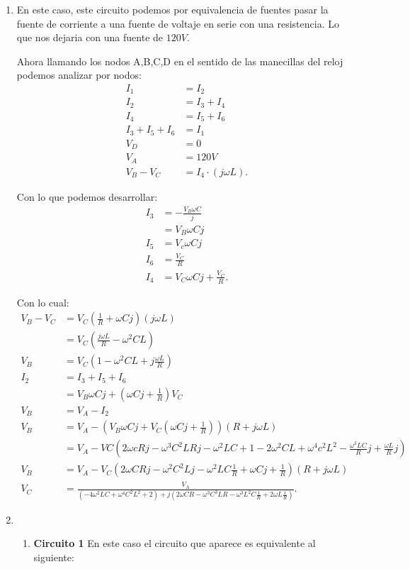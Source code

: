 \documentclass[12pt]{article}
\begin{document}
\begin{enumerate}
  \item 

    En este caso, este circuito podemos por equivalencia de fuentes pasar la fuente de corriente a una fuente de voltaje en serie con una resistencia. Lo que nos dejaria con una fuente de $120V$.

    Ahora llamando los nodos  A,B,C,D en el sentido de las manecillas del reloj podemos analizar por nodos:
     \begin{align*}
      I_1 &= I_2 \\
      I_2 &= I_3 + I_4 \\
      I_4 &= I_5 + I_6 \\
      I_3 + I_5 + I_6 &= I_1 \\
      V_D &= 0 \\
      V_{A} &= 120V \\
      V_B - V_C &= I_4\cdot (j\omega L) 
    .\end{align*}

    Con lo que podemos desarrollar:
    \begin{align*}
      I_3 &= -\frac{V_B\omega C}{j} \\
      &= V_B\omega Cj \\
      I_5 &=V_{c}\omega Cj \\
      I_6 &= \frac{V_C}{R} \\
      I_4 &= V_C\omega Cj + \frac{V_C}{R}
    .\end{align*}

    Con lo cual:
    \begin{align*}
      V_B - V_C &= V_C\left( \frac{1}{R}+\omega Cj \right) \left( j\omega L \right)\\
      &= V_C \left( \frac{j\omega L}{R} - \omega^2 CL \right)  \\
      V_B &= V_C\left( 1 - \omega^2CL + j \frac{\omega L}{R} \right)  \\
      I_2 &= I_3 + I_5 + I_6 \\
      &= V_B\omega Cj + \left( \omega Cj + \frac{1}{R} \right)V_C \\
      V_B &= V_A - I_2 \\
      V_B&= V_A-\left( V_B\omega Cj + V_C\left( \omega Cj + \frac{1}{R} \right)  \right) \left( R + j\omega L \right)  \\
      &= V_A - VC\left( 2\omega cRj - \omega^3 C^2 LRj - \omega^2LC+1 - 2\omega^2CL + \omega^{4}c^2L^2-\frac{\omega^{3}LC}{R}j + \frac{\omega L}{R}j \right)  \\
      V_B &= V_A - V_C\left( 2\omega CRj - \omega^2C^2L j - \omega^2LC \frac{1}{R} + \omega C j + \frac{1}{R} \right) \left( R+j\omega L \right)  \\
      V_C &= \frac{V_A}{\left( -4\omega^2LC + \omega^{4}C^2L^2 + 2 \right) + j\left( 2\omega CR - \omega^{3}C^{3}LR - \omega^{3}L^2 C \frac{1}{R}+ 2\omega L \frac{1}{R} \right) }
    .\end{align*}
  \item     \begin{enumerate}
      \item \textbf{Circuito 1} En este caso el circuito que aparece es equivalente al siguiente:



\end{enumerate}
\end{enumerate}
\end{document}
